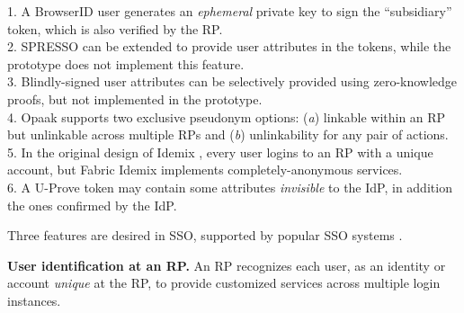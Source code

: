 \begin{table}[tb]
    \label{tbl:comparison-protocol}
\flushleft
{\footnotesize
1. A BrowserID user generates an \emph{ephemeral} private key to sign the ``subsidiary'' token,
 which is also verified by the RP.\\
2. SPRESSO can be extended to provide user attributes in the tokens, while the prototype does not implement this feature.\\
3. Blindly-signed user attributes can be selectively provided using zero-knowledge proofs,
    but not implemented in the prototype.\\
4. Opaak supports two exclusive pseudonym options: (\emph{a}) linkable within an RP but unlinkable across multiple RPs and (\emph{b}) unlinkability for any pair of actions.\\
5. In the original design of Idemix \cite{idemix}, every user logins to an RP with a unique account, but Fabric Idemix implements completely-anonymous services.\\
6. A U-Prove token may contain some attributes \emph{invisible} to the IdP, in addition the ones confirmed by the IdP.}
\end{table}

Three features are desired in SSO, supported by popular SSO systems \cite{NIST2017draft,OpenIDConnect,rfc6749,SAML,SAMLIdentifier}.

\noindent \textbf{User identification at an RP.}
An RP recognizes each user, as an identity or account \emph{unique}  at the RP,
    to provide customized services across multiple login instances.

